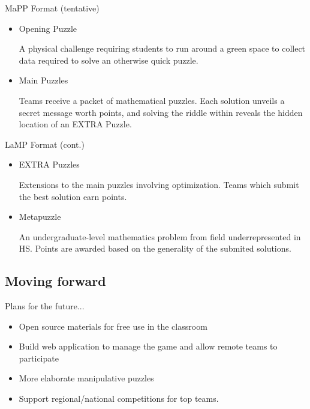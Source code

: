 \documentclass{beamer}
\theoremstyle{theorem}
\theoremstyle{definition}
\newcommand{\<}{\langle}
\renewcommand{\>}{\rangle}
\newcommand{\vpause}{\pause\vspace{1em}}
\begin{document}
\begin{frame}{MaPP Format (tentative)}

  \begin{itemize}
    \item
    Opening Puzzle

    A physical challenge requiring students to run around a green space
    to collect data required to solve an otherwise quick puzzle.

    \vpause

    \item
    Main Puzzles

    Teams receive a packet of mathematical puzzles. Each solution unveils
    a secret message worth points, and solving the riddle within reveals
    the hidden location of an EXTRA Puzzle.

  \end{itemize}
\end{frame}

\begin{frame}{LaMP Format (cont.)}

  \begin{itemize}
    \item
    EXTRA Puzzles

    Extensions to the main puzzles involving optimization.
    Teams which submit the best solution earn points.

    \vpause

    \item
    Metapuzzle

    An undergraduate-level mathematics problem from field underrepresented
    in HS. Points are awarded based on the
    generality of the submited solutions.
  \end{itemize}
\end{frame}

\subsection{Moving forward}

\begin{frame}
  Plans for the future...
  \pause
  \begin{itemize}
    \item Open source materials for free use in the classroom
    \vpause
    \item Build web application to manage the game and allow remote
          teams to participate
    \vpause
    \item More elaborate manipulative puzzles
    \vpause
    \item Support regional/national competitions for top teams.
  \end{itemize}
\end{frame}
\end{document}
